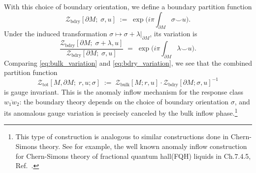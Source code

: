 \documentclass[aps,prx,reprint,superscriptaddress,twocolumn,amsmath,amssymb,amsfonts, nofootinbib]{revtex4-2}
\theoremstyle{apsstyle}
\begin{document}
With this choice of boundary orientation, we define a boundary partition function
\begin{equation}
  \mathcal Z_{\mathrm{bdry}}\left[\partial M;\;\sigma,u\right]
  \;:=\;
  \exp \Big(i\pi \int_{\partial M}\sigma\smile u\Big).
  \label{eq:boundary_counterterm}
\end{equation}
Under the induced transformation $\sigma\mapsto \sigma+\lambda|_{\partial M}$,
its variation is
\begin{equation}
  \frac{\mathcal Z_{\mathrm{bdry}}\left[\partial M;\;\sigma+\lambda,u\right]}
       {\mathcal Z_{\mathrm{bdry}}\left[\partial M;\;\sigma,u\right]}
  \;=\;
  \exp \Big(i\pi \int_{\partial M}\lambda\smile u\Big).
  \label{eq:bdry_variation}
\end{equation}
Comparing \eqref{eq:bulk_variation} and \eqref{eq:bdry_variation}, we see that the
combined partition function
\begin{equation}
  \mathcal Z_{\mathrm{tot}}[M,\partial M;\;r,u;\sigma]
  \;:=\;
  \mathcal Z_{\mathrm{bulk}}[M;r,u]\cdot
  \mathcal Z_{\mathrm{bdry}}[\partial M;\sigma,u]^{-1}
  \label{eq:total_partition}
\end{equation}
is gauge invariant.  This is the anomaly inflow mechanism for the response class $\overline{w_1w_2}$: the boundary theory depends on the choice of boundary orientation $\sigma$, and its anomalous gauge variation is precisely canceled by the bulk inflow phase.\footnote{This type of construction is analogous to similar constructions done in Chern-Simons theory. See for example, the well known anomaly inflow construction for Chern-Simons theory of fractional quantum hall(FQH) liquids in Ch.7.4.5, Ref.~\cite{wen2004quantum}.} 

\bigskip
\end{document}
